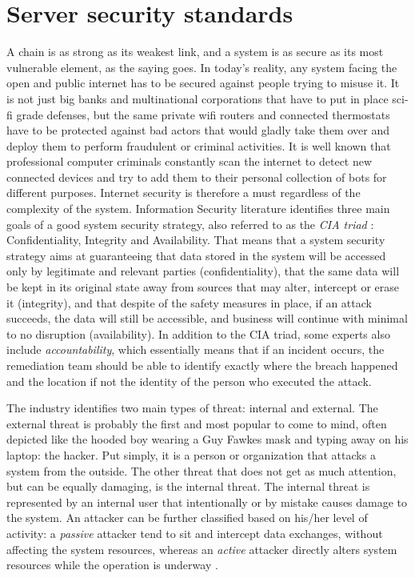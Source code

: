 \section{Server security standards}
A chain is as strong as its weakest link, and a system is as secure as its
most vulnerable element, as the saying goes. In today's reality, any system
facing the open and public internet has to be secured against people trying to
misuse it. It is not just big banks and multinational corporations that have to
put in place sci-fi grade defenses, but the same private wifi routers and
connected thermostats have to be protected against bad actors that would gladly
take them over and deploy them to perform fraudulent or criminal
activities. It is well known that professional computer criminals constantly
scan the internet to detect new connected devices and try to add them to their
personal collection of bots for different purposes.
Internet security is therefore a must regardless of the complexity of the
system. Information Security literature identifies three main goals of a good
system security strategy, also referred to as the \emph{CIA triad} \cite{DP00}:
Confidentiality, Integrity and Availability. That means that a system security
strategy aims at guaranteeing that data stored in the system will be accessed
only by legitimate and relevant parties (confidentiality), that the same data
will be kept in its original state away from sources that may alter,
intercept or erase it (integrity), and that despite of the safety measures in
place, if an attack succeeds, the data will still be accessible, and business
will continue with minimal to no disruption (availability). In addition to the
CIA triad, some experts also include \emph{accountability}, which essentially
means that if an incident occurs, the remediation team should be able to
identify exactly where the breach happened and the location if not the identity
of the person who executed the attack.

The industry identifies two main types of threat: internal and external.
The external threat is probably the first and most popular to come to mind,
often depicted like the hooded boy wearing a Guy Fawkes mask and typing away on
his laptop: the hacker. Put simply, it is a person or organization that attacks
a system from the outside. The other threat that does not get as much
attention, but can be equally damaging, is the internal threat. The internal
threat is represented by an internal user that intentionally or by mistake
causes damage to the system. An attacker can be further classified based on
his/her level of activity: a \emph{passive} attacker tend to sit and intercept
data exchanges, without affecting the system resources, whereas an \emph{active}
attacker directly alters system resources while the operation is underway
\cite{WS15}.

